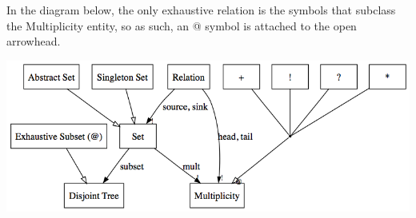 \documentclass[11pt,letterpaper]{article}
\begin{document}
\begin{enumerate}
In the diagram below, the only exhaustive relation is the symbols that subclass the Multiplicity entity, so as such, an @ symbol is attached to the open arrowhead.
\begin{center}
\includegraphics[width=400pt]{dot/metamodeling2.png}
\label{fig:ob8} 
\end{center}
\end{enumerate}
\end{document}
